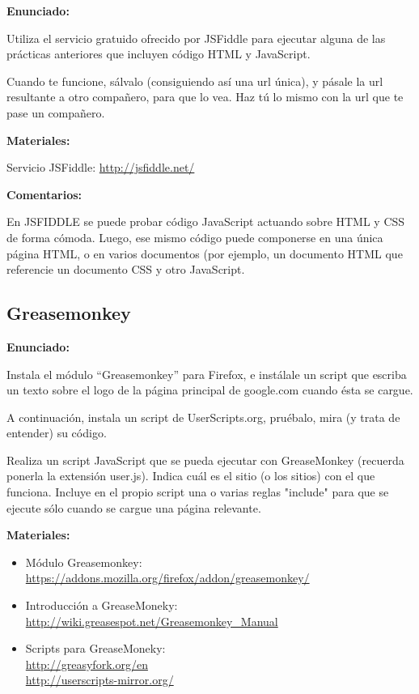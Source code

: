 \textbf{Enunciado:}

Utiliza el servicio gratuido ofrecido por JSFiddle para ejecutar alguna de las prácticas anteriores que incluyen código HTML y JavaScript.

Cuando te funcione, sálvalo (consiguiendo así una url única), y pásale la url resultante a otro compañero, para que lo vea. Haz tú lo mismo con la url que te pase un compañero.

\textbf{Materiales:}

Servicio JSFiddle: \url{http://jsfiddle.net/}

\textbf{Comentarios:}

En JSFIDDLE se puede probar código JavaScript actuando sobre HTML y CSS de forma cómoda. Luego, ese mismo código puede componerse en una única página HTML, o en varios documentos (por ejemplo, un documento HTML que referencie un documento CSS y otro JavaScript.


\subsection{Greasemonkey}
\label{subsec:eje-js-greasemonkey}

\textbf{Enunciado:}

Instala el módulo ``Greasemonkey'' para Firefox, e instálale un script que escriba un texto sobre el logo de la página principal de google.com cuando ésta se cargue.

A continuación, instala un script de UserScripts.org, pruébalo, mira (y trata de entender) su código.

Realiza un script JavaScript que se pueda ejecutar con GreaseMonkey (recuerda ponerla la extensión user.js). Indica cuál es el sitio (o los sitios) con el que funciona. Incluye en el propio script una o varias reglas "include" para que se ejecute sólo cuando se cargue una página relevante.

\textbf{Materiales:}

\begin{itemize}
\item Módulo Greasemonkey: \\
  \url{https://addons.mozilla.org/firefox/addon/greasemonkey/}

\item Introducción a GreaseMoneky: \\
  \url{http://wiki.greasespot.net/Greasemonkey_Manual}

\item Scripts para GreaseMoneky: \\
  \url{http://greasyfork.org/en} \\
  \url{http://userscripts-mirror.org/} \\

\end{itemize}


